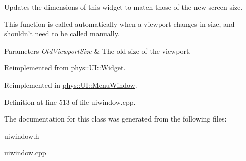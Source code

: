 Updates the dimensions of this widget to match those of the new screen size. 

This function is called automatically when a viewport changes in size, and shouldn't need to be called manually. 
\begin{DoxyParams}{Parameters}
{\em OldViewportSize} & The old size of the viewport. \\
\hline
\end{DoxyParams}


Reimplemented from \hyperlink{classphys_1_1UI_1_1Widget_acbda7003549c6caac46078c034657929}{phys::UI::Widget}.



Reimplemented in \hyperlink{classphys_1_1UI_1_1MenuWindow_a9845f7bd61f5c3f06594c4bbcbd4e063}{phys::UI::MenuWindow}.



Definition at line 513 of file uiwindow.cpp.



The documentation for this class was generated from the following files:\begin{DoxyCompactItemize}
\item 
uiwindow.h\item 
uiwindow.cpp\end{DoxyCompactItemize}
